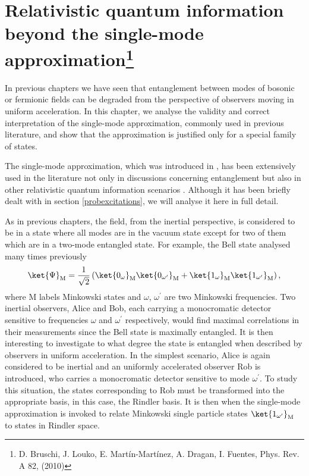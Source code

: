 


\chapter[Relativistic QI beyond the single-mode approximation]{Relativistic quantum information beyond the single-mode approximation\footnote{D. \!
Bruschi,\! J. Louko,\! E. Mart\'in-Mart\'inez,\! A. Dragan,\! I. Fuentes,\! Phys.\! Rev.\! A 82, (2010)}}\label{sma}


In previous chapters we have seen that entanglement between modes of bosonic or fermionic fields can be degraded from the perspective of observers moving  in uniform acceleration. In this chapter, we analyse the validity and correct interpretation of the single-mode approximation, commonly used in previous literature, and show that the approximation is justified only for a special family of states.  

The single-mode approximation, which was introduced in \cite{Alsingtelep,AlsingMcmhMil}, has been extensively used in the literature not only in discussions concerning entanglement but also in other relativistic quantum information scenarios \cite{Alicefalls,AlsingSchul,Bradler,highdim,chapucilla,chapucilla2,Edu2,Shapoor,matsako,Edu3,Ditta,Edu4,Geneferm,Edu5,DiracDiscord}. Although it has been briefly dealt with in section \ref{probexcitations}, we will analyse it here in full detail. 

As in previous chapters, the field, from the inertial perspective, is considered to be in a state where all modes are in the vacuum state except for two of them which are in a two-mode entangled state. For example, the Bell state analysed many times previously
\begin{equation}\label{maxent1}
\ket{\Psi}_\text{M}=\frac{1}{\sqrt2}\left(\ket{0_{\omega}}_\text{M}\ket{0_{\omega^{\prime}}}_\text{M}+\ket{1_{\omega}}_\text{M}\ket{1_{\omega^{\prime}}}_\text{M}\right),
\end{equation}
where M labels Minkowski states and $\omega$, $\omega^{\prime}$ are two Minkowski frequencies.  Two inertial observers, Alice and Bob, each carrying a monocromatic detector sensitive to frequencies $\omega$ and $\omega^{\prime}$ respectively,  would find maximal correlations in their measurements since the Bell state is maximally entangled. It is then interesting to investigate to what degree the state is entangled when described by observers in uniform acceleration. In the simplest scenario,  Alice is again considered to be inertial and an uniformly accelerated observer Rob is introduced, who carries a monocromatic detector sensitive to mode $\omega^{\prime}$.  To study this situation, the states corresponding to Rob must be transformed into the appropriate basis, in this case, the Rindler basis.  It is then when the  single-mode approximation is invoked to relate Minkowski single particle states $\ket{1_{\omega^{\prime}}}_\text{M}$  to states in Rindler space. 

